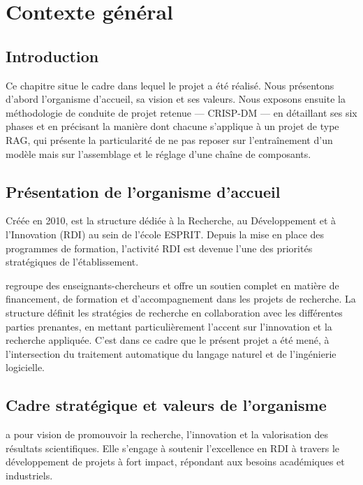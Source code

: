 \chapter{Contexte général}
\label{ch:contexte}

\section{Introduction}

Ce chapitre situe le cadre dans lequel le projet a été réalisé. Nous présentons
d'abord l'organisme d'accueil, sa vision et ses valeurs. Nous exposons ensuite la
méthodologie de conduite de projet retenue --- CRISP-DM --- en détaillant ses
six phases et en précisant la manière dont chacune s'applique à un projet de
type RAG, qui présente la particularité de ne pas reposer sur l'entraînement
d'un modèle mais sur l'assemblage et le réglage d'une chaîne de composants.

\section{Présentation de l'organisme d'accueil}

Créée en 2010, \organism{} est la structure dédiée à la Recherche, au
Développement et à l'Innovation (RDI) au sein de l'école ESPRIT. Depuis la mise
en place des programmes de formation, l'activité RDI est devenue l'une des
priorités stratégiques de l'établissement.

\organism{} regroupe des enseignants-chercheurs et offre un soutien complet en
matière de financement, de formation et d'accompagnement dans les projets de
recherche. La structure définit les stratégies de recherche en collaboration
avec les différentes parties prenantes, en mettant particulièrement l'accent sur
l'innovation et la recherche appliquée. C'est dans ce cadre que le présent
projet a été mené, à l'intersection du traitement automatique du langage naturel
et de l'ingénierie logicielle.

\section{Cadre stratégique et valeurs de l'organisme}

\organism{} a pour vision de promouvoir la recherche, l'innovation et la
valorisation des résultats scientifiques. Elle s'engage à soutenir l'excellence
en RDI à travers le développement de projets à fort impact, répondant aux
besoins académiques et industriels.

